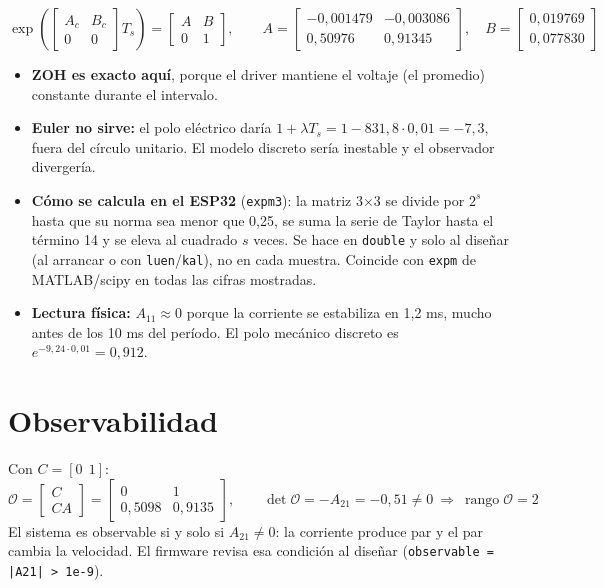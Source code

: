 \documentclass[11pt]{article}
\newcommand{\cod}[1]{\texttt{#1}}
\begin{document}
\begin{equation}
\exp\!\left(\begin{bmatrix}A_c & B_c\\ 0 & 0\end{bmatrix}T_s\right)=\begin{bmatrix}A & B\\ 0 & 1\end{bmatrix},\qquad
A=\begin{bmatrix}-0{,}001479 & -0{,}003086\\ 0{,}50976 & 0{,}91345\end{bmatrix},\quad B=\begin{bmatrix}0{,}019769\\ 0{,}077830\end{bmatrix}
\end{equation}
\begin{itemize}
  \item \textbf{ZOH es exacto aquí}, porque el driver mantiene el voltaje (el promedio) constante durante el intervalo.
  \item \textbf{Euler no sirve:} el polo eléctrico daría $1+\lambda T_s=1-831{,}8\cdot0{,}01=-7{,}3$, fuera del círculo unitario. El modelo discreto sería inestable y el observador divergería.
  \item \textbf{Cómo se calcula en el ESP32} (\cod{expm3}): la matriz 3×3 se divide por $2^s$ hasta que su norma sea menor que 0,25, se suma la serie de Taylor hasta el término 14 y se eleva al cuadrado $s$ veces. Se hace en \cod{double} y solo al diseñar (al arrancar o con \cod{luen}/\cod{kal}), no en cada muestra. Coincide con \cod{expm} de MATLAB/scipy en todas las cifras mostradas.
  \item \textbf{Lectura física:} $A_{11}\approx0$ porque la corriente se estabiliza en 1,2 ms, mucho antes de los 10 ms del período. El polo mecánico discreto es $e^{-9{,}24\cdot0{,}01}=0{,}912$.
\end{itemize}

\section{Observabilidad}
Con $C=[0\ \ 1]$:
\begin{equation}
\mathcal O=\begin{bmatrix}C\\ CA\end{bmatrix}=\begin{bmatrix}0 & 1\\ 0{,}5098 & 0{,}9135\end{bmatrix},\qquad \det\mathcal O=-A_{21}=-0{,}51\neq0\ \Rightarrow\ \operatorname{rango}\mathcal O=2
\end{equation}
El sistema es observable si y solo si $A_{21}\neq0$: la corriente produce par y el par cambia la velocidad. El firmware revisa esa condición al diseñar (\cod{observable = |A21| > 1e-9}).
\end{document}
